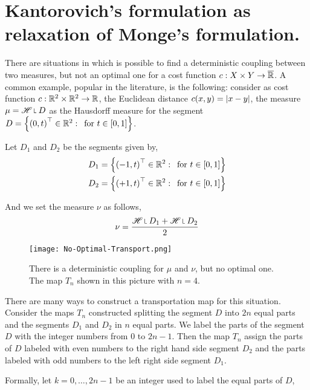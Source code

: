 \section{Kantorovich's formulation as relaxation of Monge's formulation.}

There are situations in which is possible to find a deterministic coupling between two measures, but not an optimal one for a cost function $c:X\times Y \rightarrow \overline{\mathbb{R}}$. A common example, popular in the literature, is the following: consider as cost function $c:\mathbb{R}^2\times\mathbb{R}^2 \rightarrow \mathbb{R}$, the Euclidean distance $c(x,y)=\left| x-y \right|$, the measure $\mu=\Hausdorff\measurerestr D$ as the Hausdorff measure for the segment  $D=\left\lbrace \left( 0, t \right)^\top \in \mathbb{R}^2:\, \text{ for } t\in [0,1] \right\rbrace$. 

Let $D_1$ and $D_2$ be the segments given by,
\begin{align*}
D_1 = \left\lbrace \left( -1, t \right)^\top\in\mathbb{R}^2:\, \text{ for } t\in [0,1] \right\rbrace \\
D_2 = \left\lbrace \left( +1, t \right)^\top\in\mathbb{R}^2:\, \text{ for } t\in [0,1] \right\rbrace
\end{align*}

And we set the measure $\nu$ as follows, 
\begin{equation*}
\nu=\frac{\Hausdorff\measurerestr D_1 + \Hausdorff \measurerestr D_2}{2}
\end{equation*}

\begin{figure}[H]
	\begin{center}
	\texttt{[image: No-Optimal-Transport.png]}
	\caption{There is a deterministic coupling for $\mu$ and $\nu$, but no optimal one. The map $T_n$ shown in this picture with $n=4$.}	
	\end{center}

\end{figure}


There are many ways to construct a transportation map for this situation. Consider the maps $T_n$ constructed splitting the segment $D$ into $2n$ equal parts and the segments $D_1$ and $D_2$ in $n$ equal parts. We label the parts of the segment $D$ with the integer numbers from $0$ to $2n-1$. Then the map $T_n$ assign the parts of $D$ labeled with even numbers to the right hand side segment $D_2$ and the parts labeled with odd numbers to the left right side segment $D_1$. 

Formally, let $k=0, \dots, 2n-1$ be an integer used to label the equal parts of $D$,

